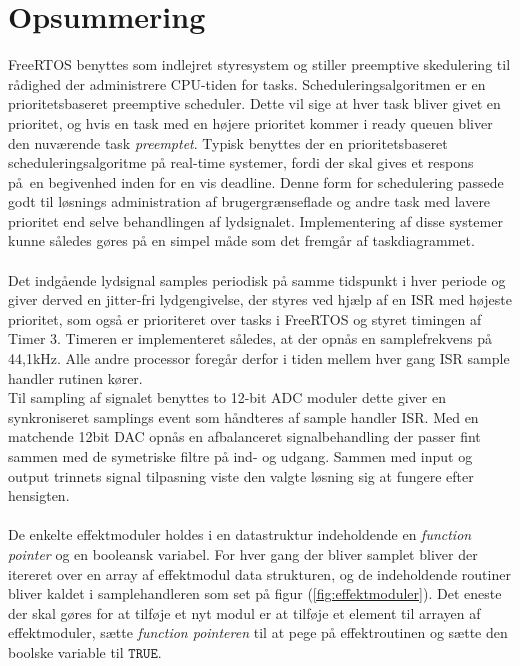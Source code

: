 \section{Opsummering}

FreeRTOS benyttes som indlejret styresystem og stiller preemptive skedulering til rådighed der administrere CPU-tiden for tasks. 
Scheduleringsalgoritmen er en prioritetsbaseret preemptive scheduler.
Dette vil sige at hver task bliver givet en prioritet, og hvis en task med en højere prioritet kommer i ready queuen bliver den nuværende task \textit{preemptet}.
Typisk benyttes der en prioritetsbaseret scheduleringsalgoritme på real-time systemer, fordi der skal gives et respons på en begivenhed inden for en vis deadline.
Denne form for schedulering passede godt til løsnings administration af brugergrænseflade og andre task med lavere prioritet end selve behandlingen af lydsignalet. 
Implementering af disse systemer kunne således gøres på en simpel måde som det fremgår af taskdiagrammet.
\\
\\
Det indgående lydsignal samples periodisk på samme tidspunkt i hver periode og giver derved en jitter-fri lydgengivelse, der
styres ved hjælp af en ISR med højeste prioritet, som også er prioriteret over tasks i FreeRTOS og styret timingen af Timer 3.
Timeren er implementeret således, at der opnås en samplefrekvens på 44,1kHz. 
Alle andre processor foregår derfor i tiden mellem hver gang ISR sample handler rutinen kører. 
\\
Til sampling af signalet benyttes to 12-bit ADC moduler dette giver en synkroniseret samplings event som håndteres af sample handler ISR.
Med en matchende 12bit DAC opnås en afbalanceret signalbehandling der passer fint sammen med de symetriske filtre på ind- og udgang.
Sammen med input og output trinnets signal tilpasning viste den valgte løsning sig at fungere efter hensigten.
\\
\\
De enkelte effektmoduler holdes i en datastruktur indeholdende en \textit{function pointer} og en booleansk variabel.
For hver gang der bliver samplet bliver der itereret over en array af effektmodul data strukturen, og de indeholdende routiner bliver kaldet i samplehandleren som set på figur (\ref{fig:effektmoduler}).\newline
Det eneste der skal gøres for at tilføje et nyt modul er at tilføje et element til arrayen af effektmoduler, sætte \textit{function pointeren} til at pege på effektroutinen og sætte den boolske variable til $\mathtt{TRUE}$.
